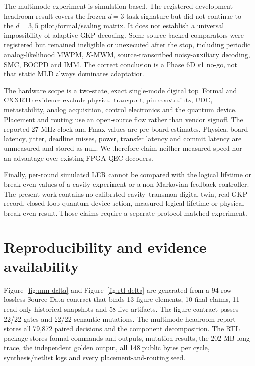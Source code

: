 \documentclass[11pt]{article}
\begin{document}
The multimode experiment is simulation-based.  The registered development
headroom result covers the frozen $d=3$ task signature but did not continue to
the $d=3,5$ pilot/formal/scaling matrix.  It does not establish a universal
impossibility of adaptive GKP decoding.  Some source-backed comparators were
registered but remained ineligible or unexecuted after the stop, including
periodic analog-likelihood MWPM, $K$-MWM, source-transcribed noisy-auxiliary
decoding, SMC, BOCPD and IMM.  The correct conclusion is a Phase 6D v1 no-go,
not that static MLD always dominates adaptation.

The hardware scope is a two-state, exact single-mode digital top.  Formal and
CXXRTL evidence exclude physical transport, pin constraints, CDC,
metastability, analog acquisition, control electronics and the quantum device.
Placement and routing use an open-source flow rather than vendor signoff.  The
reported 27-MHz clock and Fmax values are pre-board estimates.  Physical-board
latency, jitter, deadline misses, power, transfer latency and commit latency are
unmeasured and stored as null.  We therefore claim neither measured speed nor
an advantage over existing FPGA QEC decoders.

Finally, per-round simulated LER cannot be compared with the logical lifetime
or break-even values of a cavity experiment or a non-Markovian feedback
controller.  The present work contains no calibrated cavity--transmon digital
twin, real GKP record, closed-loop quantum-device action, measured logical
lifetime or physical break-even result.  Those claims require a separate
protocol-matched experiment.

\section{Reproducibility and evidence availability}

Figure~\ref{fig:mm-delta} and Figure~\ref{fig:rtl-delta} are generated from a
94-row lossless Source Data contract that binds 13 figure elements, 10 final
claims, 11 read-only historical snapshots and 58 live artifacts.  The figure
contract passes 22/22 gates and 22/22 semantic mutations.  The multimode
headroom report stores all 79,872 paired decisions and the component
decomposition.  The RTL package stores formal commands and outputs, mutation
results, the 202-MB long trace, the independent golden output, all 148 public
bytes per cycle, synthesis/netlist logs and every placement-and-routing seed.
\end{document}
